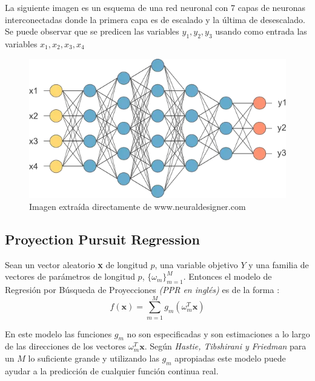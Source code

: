 \noindent La siguiente imagen es un esquema de una red neuronal con 7 capas de neuronas interconectadas donde la primera capa es de escalado y la última de desescalado. Se puede observar que se predicen las variables $y_1, y_2, y_3$ usando como entrada las variables $x_1,x_2,x_3,x_4$ 

\begin{figure}[h]
\centering
\includegraphics[scale=0.5]{Documentos Extra/Imagenes/red-neuronal-grande.png}
\caption{Imagen extraída directamente de www.neuraldesigner.com}
\end{figure}
\subsection{Proyection Pursuit Regression}

\noindent Sean un vector aleatorio \textbf{x} de longitud $p$, una variable objetivo $Y$ y una familia de vectores de parámetros de longitud $p$, $\lbrace \omega_m\rbrace_{m=1}^M$. Entonces el modelo de Regresión por Búsqueda de Proyecciones \textit{(PPR en inglés)} es de la forma :
\begin{equation}
f(\textbf{x})=\sum_{m=1}^M g_m(\omega_m^T \textbf{x})
\end{equation}

\noindent En este modelo las funciones $g_m$ no son especificadas y son estimaciones a lo largo de las direcciones de los vectores $\omega_m^T \textbf{x}$. Según \textit{Hastie, Tibshirani y Friedman} \cite{Hastie 2001} para un $M$ lo suficiente grande y utilizando las $g_m$ apropiadas este modelo puede ayudar a la predicción de cualquier función continua real. 

